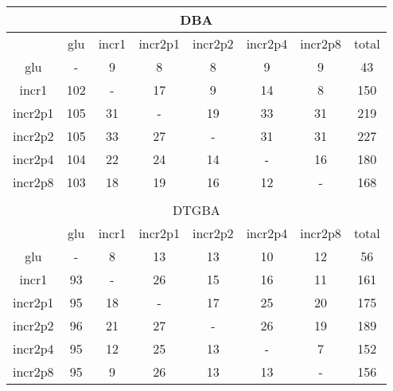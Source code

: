 \begin{tabular}{|c|c|c|c|c|c|c|c|}
\hline
\multicolumn{8}{|c|}{DBA}\\
\hline
&glu&incr1&incr2p1&incr2p2&incr2p4&incr2p8&total\\
\hline
glu&{-}&9&8&8&9&9&43\\
\hline
incr1&102&{-}&17&9&14&8&150\\
\hline
incr2p1&105&31&{-}&19&33&31&219\\
\hline
incr2p2&105&33&27&{-}&31&31&227\\
\hline
incr2p4&104&22&24&14&{-}&16&180\\
\hline
incr2p8&103&18&19&16&12&{-}&168\\
\hline
\multicolumn{8}{c}{}\\
\hline
\multicolumn{8}{|c|}{DTGBA}\\
\hline
&glu&incr1&incr2p1&incr2p2&incr2p4&incr2p8&total\\
\hline
glu&{-}&8&13&13&10&12&56\\
\hline
incr1&93&{-}&26&15&16&11&161\\
\hline
incr2p1&95&18&{-}&17&25&20&175\\
\hline
incr2p2&96&21&27&{-}&26&19&189\\
\hline
incr2p4&95&12&25&13&{-}&7&152\\
\hline
incr2p8&95&9&26&13&13&{-}&156\\
\hline
\end{tabular}